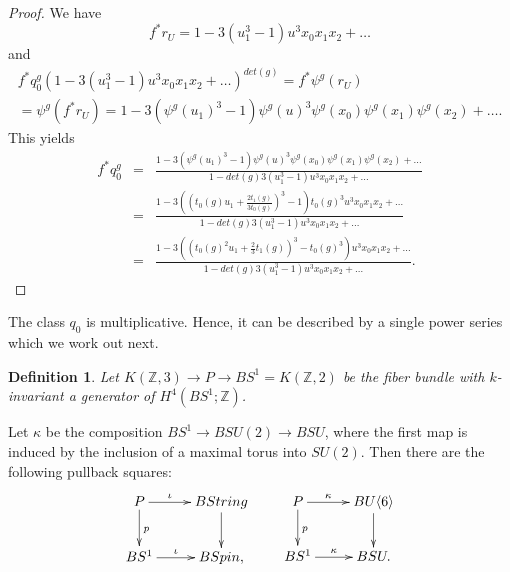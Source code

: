 \documentclass{amsart}
\newcommand {\Z}{{\mathbb Z}}
\numberwithin{equation}{section}
\newtheorem{defn}[thm]{Definition}
\theoremstyle{definition}  %
\newenvironment{definition}{\begin{defn}\rm}{\end{defn}}
\newtheorem{set theory}[thm]{Set Theoretic Prelude}
\begin{document}
\begin{proof}
We have $$f^*r_U=1-3(u_1^3-1)u^3x_0x_1x_2+\dots$$
and
\begin{eqnarray*}
f^*q_0^g(1-3(u_1^3-1)u^3x_0x_1x_2+\dots)^{det(g)}= f^*\psi^g(r_U)\\
=\psi^g(f^*r_U) = 
1-3(\psi^g(u_1)^3-1)\psi^g(u)^3\psi^g(x_0)\psi^g(x_1)\psi^g(x_2)+\dots .
\end{eqnarray*}
This yields
\begin{eqnarray*}
f^*q_0^g&=&\frac{1-3(\psi^g(u_1)^3-1)\psi^g(u)^3\psi^g(x_0)\psi^g(x_1)\psi^g(x_2)+\dots}
{1-det(g)3(u_1^3-1)u^3x_0x_1x_2+\dots}\\
&=& \frac{1-3((t_0(g)u_1+\frac{2t_1(g)}{3t_0(g)})^3-1) t_0(g)^3u^3x_0x_1x_2+\dots}
{1-det(g)3(u_1^3-1)u^3x_0x_1x_2+\dots}\\
&=& \frac{1-3((t_0(g)^2u_1+\frac{2}{3}t_1(g))^3-t_0(g)^3) u^3x_0x_1x_2+\dots}
{1-det(g)3(u_1^3-1)u^3x_0x_1x_2+\dots}.
\end{eqnarray*}
\end{proof}
The class $q_0$ is multiplicative. Hence, it can be described by a single power series which we work out next.

\begin{definition}
Let $K(\Z,3)\to P\to BS^1=K(\Z,2)$ be the fiber bundle with $k$-invariant a generator of $H^4(BS^1;\Z)$.
\end{definition}
Let $\kappa$ be the composition $BS^1\to BSU(2)\to BSU$, where the first map is induced by the inclusion of 
a maximal torus into $SU(2)$.
Then there are the following pullback squares:
$$
\xymatrix{P\ar[r]^-\iota\ar[d]^p&  BString \ar[d]\\  BS^1 \ar[r]^-\iota &BSpin, }\qquad
\xymatrix{P\ar[r]^-\kappa\ar[d]^p&  BU\langle 6\rangle \ar[d]\\  BS^1 \ar[r]^-\kappa &BSU. }
$$
\end{document}
